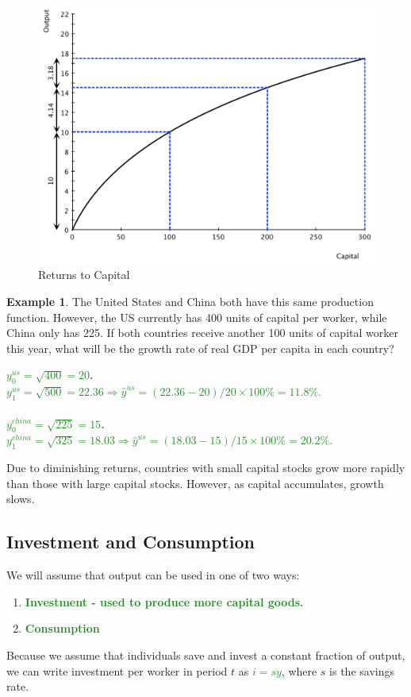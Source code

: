 \documentclass[11pt]{article}\usepackage[]{graphicx}\usepackage[]{color}
\theoremstyle{definition}
\newtheorem{exmp}{Example}[section]
\newcommand{\blank}[1]{}
\newcommand{\ddp}[1]{{\textbf{\textcolor{ForestGreen}{#1}}}}
\newcommand{\dd}[1]{{\underline{\textbf{\textcolor{ForestGreen}{#1}}}}}
\begin{document}
		\begin{figure}[H]
			\centering
			\includegraphics[scale=.40]{plot83.pdf}
			\caption{Returns to Capital}
		\end{figure}


\begin{exmp}
The United States and China both have this same production function. However, the US currently has 400 units of capital per worker, while China only has 225. If both countries receive another 100 units of capital worker this year, what will be the growth rate of real GDP per capita in each country? 
\end{exmp}
\ddp{$y_0^{us} = \sqrt{400} = 20$. $y_1^{us} = \sqrt{500} = 22.36 \Rightarrow \hat{y}^{us} = (22.36-20)/20 \times 100\% = 11.8\%.$ \\ \\
	$y_0^{china} = \sqrt{225} = 15$. $y_1^{china} = \sqrt{325} = 18.03 \Rightarrow \hat{y}^{us} = (18.03-15)/15 \times 100\% = 20.2\%.$\\} 
\blank{}
\blank{}


Due to diminishing returns, countries with small capital stocks grow more rapidly than those with large capital stocks. However, as capital accumulates, growth slows. 

\subsection{Investment and Consumption}

We will assume that output can be used in one of two ways: 
\begin{enumerate}
	\item \ddp{Investment - used to produce more capital goods.}
	\item \ddp{Consumption}
\end{enumerate}
Because we assume that individuals save and invest a constant fraction of output, we can write investment per worker in period $t$ as \dd{$i = sy$}, where $s$ is the savings rate.
\\
\end{document}
